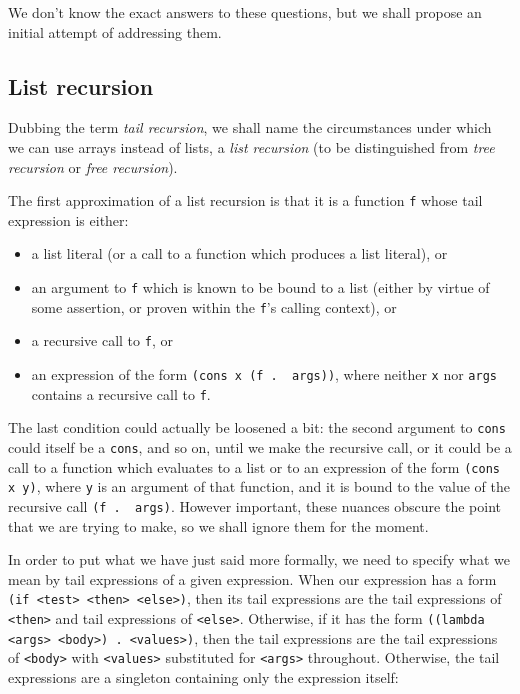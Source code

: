 We don't know the exact answers to these questions, but we shall
propose an initial attempt of addressing them.

\subsection{List recursion}

Dubbing the term \emph{tail recursion}, we shall name the circumstances
under which we can use arrays instead of lists, a \emph{list recursion}
(to be distinguished from \emph{tree recursion} or \emph{free recursion}).

The first approximation of a list recursion is that it is a function \texttt{f}
whose tail expression is either:
\begin{itemize}
\item a list literal (or a call to a function which produces a list literal), or
\item an argument to \texttt{f} which is known to be bound to a list
  (either by virtue of some assertion, or proven within the \texttt{f}'s
  calling context), or
\item a recursive call to \texttt{f}, or
\item an expression of the form \texttt{(cons x (f .\,\,args))}, where
  neither \texttt{x} nor \texttt{args} contains a recursive call to \texttt{f}.
\end{itemize}

The last condition could actually be loosened a bit: the second argument
to \texttt{cons} could itself be a \texttt{cons}, and so on, until we
make the recursive call, or it could be a call to a function which evaluates
to a list or to an expression of the form \texttt{(cons x y)}, where
\texttt{y} is an argument of that function, and it is bound to the value
of the recursive call \texttt{(f .\,\,args)}. However important, these
nuances obscure the point that we are trying to make, so we shall ignore
them for the moment.

In order to put what we have just said more formally, we need to specify
what we mean by tail expressions of a given expression. When our
expression has a form \texttt{(if <test> <then> <else>)}, then its
tail expressions are the tail expressions of \texttt{<then>} and
tail expressions of \texttt{<else>}. Otherwise, if it has the form
\texttt{((lambda <args> <body>) . <values>)}, then the tail expressions
are the tail expressions of \texttt{<body>} with \texttt{<values>}
substituted for \texttt{<args>} throughout. Otherwise, the tail expressions
are a singleton containing only the expression itself:

